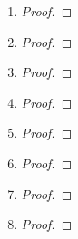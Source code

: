 \documentclass[11pt]{article}
\begin{document}
\begin{enumerate}
    \item
        \begin{proof}
        \end{proof}
        
    \item
        \begin{proof}
        \end{proof}
        
    \item
        \begin{proof}
        \end{proof}
        
    \item
        \begin{proof}
        \end{proof}
        
    \item
        \begin{proof}
        \end{proof}
        
    \item
        \begin{proof}
        \end{proof}
        
    \item
        \begin{proof}
        \end{proof}
        
    \item
        \begin{proof}
        \end{proof}
    
\end{enumerate}
\end{document}
